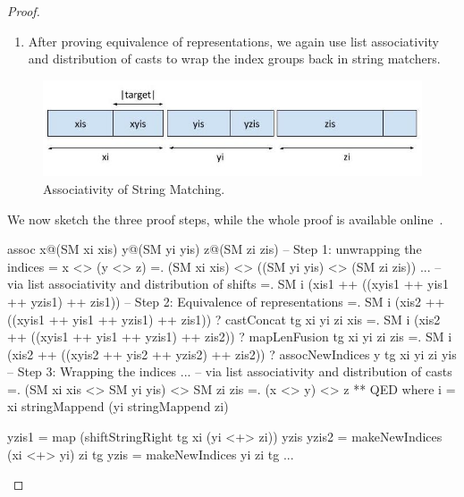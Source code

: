 \begin{proof}
\begin{enumerate}
\begin{code}
  zis2 = map (shiftStringRight tg (xi stringMappend yi) zi) zis
\end{code}
That is, in right first, the indices of @z@ are first shifted
by the length of @yi@ and then by the length of @xi@,
while in the left first case, the indices of @z@ are shifted by the
length of @xi stringMappend yi@.
In this second step of the proof we prove, using lemmata,
the equivalence of the different group representations.
%
The most interesting lemma we use is called @assocNewIndices@ and proves
equivalence of all the three middle groups together
by case analysis on the relative lengths of the target @tg@ and the middle string @yi@.
\item After proving equivalence of representations,
we again use list associativity and distribution of casts to wrap the
index groups back in string matchers.
\end{enumerate}
\begin{figure}
\centering
\captionsetup{justification=centering}
\includegraphics[scale=0.5]{text/stringmatcher/AssociativeIndices}
\caption{Associativity of String Matching.}
\label{fig:mappend:assoc}
\end{figure}
We now sketch the three proof steps, while the whole proof
is available online~\cite{implementation}.
\begin{code}
  assoc x@(SM xi xis) y@(SM yi yis) z@(SM zi zis)
    -- Step 1: unwrapping the indices
    =   x <> (y <> z)
    =. (SM xi xis) <> ((SM yi yis) <> (SM zi zis))
                         ...
    -- via list associativity and distribution of shifts
    =. SM i (xis1 ++ ((xyis1 ++ yis1 ++ yzis1) ++ zis1))
    -- Step 2: Equivalence of representations
    =. SM i (xis2 ++ ((xyis1 ++ yis1 ++ yzis1) ++ zis1))
       ? castConcat tg xi yi zi xis
    =. SM i (xis2 ++ ((xyis1 ++ yis1 ++ yzis1) ++ zis2))
       ? mapLenFusion tg xi yi zi zis
    =. SM i (xis2 ++ ((xyis2 ++ yis2 ++ yzis2) ++ zis2))
       ? assocNewIndices y tg xi yi zi yis
    -- Step 3: Wrapping the indices
                         ...
    -- via list associativity and distribution of casts
    =. (SM xi xis <> SM yi yis) <> SM zi zis
    =. (x <> y) <> z
    ** QED
    where
      i     = xi stringMappend (yi stringMappend zi)

      yzis1 = map (shiftStringRight tg xi (yi <+> zi)) yzis
      yzis2 = makeNewIndices (xi <+> yi) zi tg
      yzis  = makeNewIndices yi zi tg
      ...
\end{code}
\cqed\end{proof}
